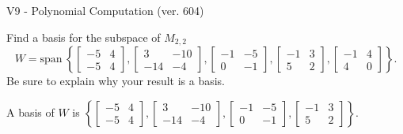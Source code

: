 \begin{exercise}
  \begin{exerciseTitle}V9 - Polynomial Computation (ver. 604)\end{exerciseTitle}
  \begin{exerciseStatement}
    Find a basis for the subspace of \(M_{2,2}\) 
\[W=\mathrm{span}\ \left\{\left[\begin{array}{cc}
-5 & 4 \\
-5 & 4
\end{array}\right] , \left[\begin{array}{cc}
3 & -10 \\
-14 & -4
\end{array}\right] , \left[\begin{array}{cc}
-1 & -5 \\
0 & -1
\end{array}\right] , \left[\begin{array}{cc}
-1 & 3 \\
5 & 2
\end{array}\right] , \left[\begin{array}{cc}
-1 & 4 \\
4 & 0
\end{array}\right]\right\}.\]
 Be sure to explain why your result is a basis.


  \end{exerciseStatement}
  \begin{exerciseAnswer}
   A basis of \(W\) is  \(\left\{\left[\begin{array}{cc}
-5 & 4 \\
-5 & 4
\end{array}\right] , \left[\begin{array}{cc}
3 & -10 \\
-14 & -4
\end{array}\right] , \left[\begin{array}{cc}
-1 & -5 \\
0 & -1
\end{array}\right] , \left[\begin{array}{cc}
-1 & 3 \\
5 & 2
\end{array}\right]\right\}\).
  


  \end{exerciseAnswer}
\end{exercise}